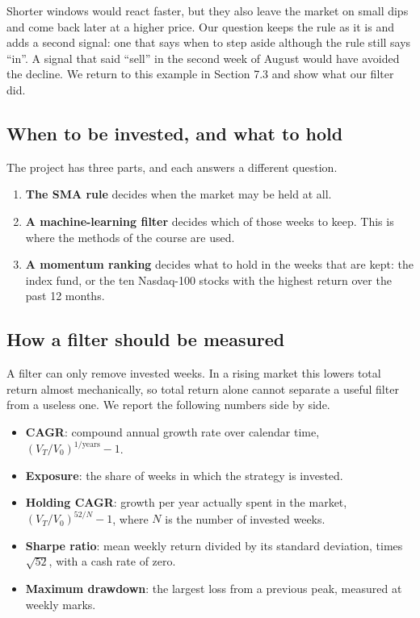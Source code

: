 \documentclass[11pt]{article}
\providecommand{\tightlist}{\setlength{\itemsep}{2pt}\setlength{\parskip}{0pt}}
\begin{document}
Shorter windows would react faster, but they also leave the market on small dips and come back later at a higher price. Our question keeps the rule as it is and adds a second signal: one that says when to step aside although the rule still says ``in''. A signal that said ``sell'' in the second week of August would have avoided the decline. We return to this example in Section 7.3 and show what our filter did.

\subsection{When to be invested, and what to hold}

The project has three parts, and each answers a different question.

\begin{enumerate}
\def\labelenumi{\arabic{enumi}.}
\tightlist
\item
  \textbf{The SMA rule} decides when the market may be held at all.
\item
  \textbf{A machine-learning filter} decides which of those weeks to keep. This is where the methods of the course are used.
\item
  \textbf{A momentum ranking} decides what to hold in the weeks that are kept: the index fund, or the ten Nasdaq-100 stocks with the highest return over the past 12 months.
\end{enumerate}

\subsection{How a filter should be measured}

A filter can only remove invested weeks. In a rising market this lowers total return almost mechanically, so total return alone cannot separate a useful filter from a useless one. We report the following numbers side by side.

\begin{itemize}
\tightlist
\item
  \textbf{CAGR}: compound annual growth rate over calendar time, \((V_T/V_0)^{1/\text{years}} - 1\).
\item
  \textbf{Exposure}: the share of weeks in which the strategy is invested.
\item
  \textbf{Holding CAGR}: growth per year actually spent in the market, \((V_T/V_0)^{52/N} - 1\), where \(N\) is the number of invested weeks.
\item
  \textbf{Sharpe ratio}: mean weekly return divided by its standard deviation, times \(\sqrt{52}\), with a cash rate of zero.
\item
  \textbf{Maximum drawdown}: the largest loss from a previous peak, measured at weekly marks.
\end{itemize}
\end{document}
